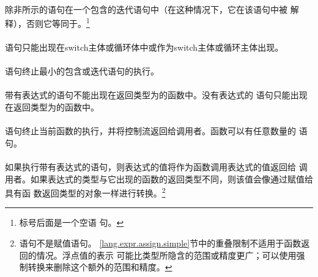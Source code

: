 {\begin{minipage}{0.30\linewidth}
  \mbox{\hspace{2em}}                                           \\
  \mbox{\hspace{2em}}                                           \\
  \mbox{\hspace{2em}}                                           \\
\mbox{\hspace{0em}}                                               \\
\mbox{\hspace{0em}\tm{\}}}
\end{minipage}                                                              \\\\
除非所示的语句在一个包含的迭代语句中（在这种情况下，它在该语句中被
解释），否则它等同于。\footnote{标号后面是一个空语
句。}

\constraint
\paragraph{}
语句只能出现在switch主体或循环体中或作为switch主体或循环主体出现。

\semantic
\paragraph{}
语句终止最小的包含或迭代语句的执行。

\constraint
\paragraph{}
带有表达式的语句不能出现在返回类型为的函数中。没有表达式的
语句只能出现在返回类型为的函数中。

\semantic
\paragraph{}
语句终止当前函数的执行，并将控制流返回给调用者。函数可以有任意数量的
语句。

\paragraph{}
如果执行带有表达式的语句，则表达式的值将作为函数调用表达式的值返回给
调用者。如果表达式的类型与它出现的函数的返回类型不同，则该值会像通过赋值给具有函
数返回类型的对象一样进行转换。\footnote{语句不是赋值语句。
\ref{lang.expr.assign.simple}节中的重叠限制不适用于函数返回的情况。浮点值的表示
可能比类型所隐含的范围或精度更广；可以使用强制转换来删除这个额外的范围和精度。}

}
